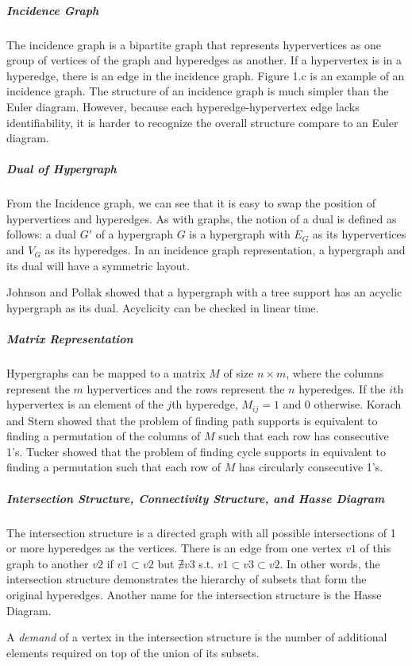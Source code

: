 \documentclass{NSF}
\begin{document}
\subparagraph{Incidence Graph}
The incidence graph is a bipartite graph that represents hypervertices as one group of vertices of the graph and hyperedges as another. If a hypervertex is in a hyperedge, there is an edge in the incidence graph. Figure 1.c is an example of an incidence graph.
The structure of an incidence graph is much simpler than the Euler diagram. However, because each hyperedge-hypervertex edge lacks identifiability, it is harder to recognize the overall structure compare to an Euler diagram.

\subparagraph{Dual of Hypergraph}
From the Incidence graph, we can see that it is easy to swap the position of hypervertices and hyperedges. As with graphs, the notion of a dual is defined as follows: a dual $G'$ of a hypergraph $G$ is a hypergraph with $E_G$ as its hypervertices and $V_G$ as its hyperedges. In an incidence graph representation, a hypergraph and its dual will have a symmetric layout.

Johnson and Pollak \cite{johnson1987} showed that a hypergraph with a tree support has an acyclic hypergraph as its dual. Acyclicity can be checked in linear time.


\subparagraph{Matrix Representation}
Hypergraphs can be mapped to a matrix $M$ of size $n\times m$, where the columns represent the $m$ hypervertices and the rows represent the $n$ hyperedges. If the $i$th hypervertex is an element of the $j$th hyperedge, $M_{ij} = 1$ and 0 otherwise. Korach and Stern showed that the problem of finding path supports is equivalent to finding a permutation of the columns of $M$ such that each row has consecutive 1's. Tucker showed that the problem of finding cycle supports in equivalent to finding a permutation such that each row of $M$ has circularly consecutive 1's.

\subparagraph{Intersection Structure, Connectivity Structure, and Hasse Diagram}
The intersection structure is a directed graph with all possible intersections of 1 or more hyperedges as the vertices. There is an edge from one vertex $v1$ of this graph to another $v2$ if $v1 \subset v2$ but $\nexists v3$ s.t. $v1 \subset v3 \subset v2$. In other words, the intersection structure demonstrates the hierarchy of subsets that form the original hyperedges. Another name for the intersection structure is the Hasse Diagram. 

A \textit{demand} of a vertex in the intersection structure is the number of additional elements required on top of the union of its subsets.
\end{document}

